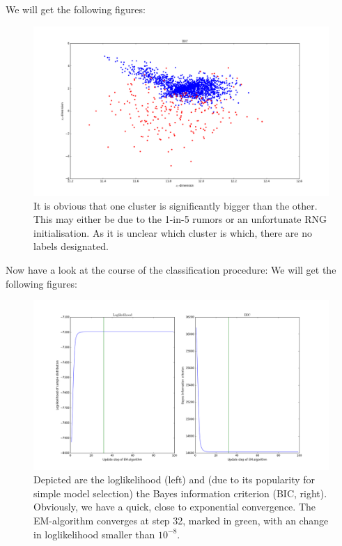 We will get the following figures:
\begin{figure}[H]
	\centering \includegraphics{../Figures/Ex3_2_scatters.png}
	\caption{It is obvious that one cluster is significantly bigger than the other. This may either be due to the 1-in-5 rumors or an unfortunate RNG initialisation. As it is unclear which cluster is which, there are no labels designated.}
	\label{fig:32scatter}
\end{figure}

Now have a look at the course of the classification procedure:
We will get the following figures:
\begin{figure}[H]
	\centering \includegraphics{../Figures/Ex3_2_llh.png}
	\caption{Depicted are the loglikelihood (left) and (due to its popularity for simple model selection) the Bayes information criterion (BIC, right). Obviously, we have a quick, close to exponential convergence. The EM-algorithm converges at step 32, marked in green, with an change in loglikelihood smaller than $10^{-8}$.}
	\label{fig:32llh}
\end{figure}

